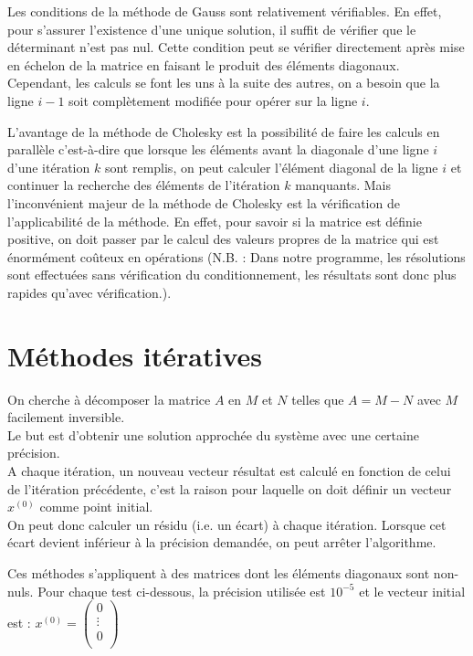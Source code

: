 \documentclass{report}
\begin{document}
    \vspace{0.7cm}
    Les conditions de la méthode de Gauss sont relativement vérifiables. En effet, pour s'assurer l'existence d'une unique solution, il suffit de vérifier que le déterminant n'est pas nul. Cette condition peut se vérifier directement après mise en échelon de la matrice en faisant le produit des éléments diagonaux.\\
    Cependant, les calculs se font les uns à la suite des autres, on a besoin que la ligne $i-1$ soit complètement modifiée pour opérer sur la ligne $i$.

    \vspace{0.7cm}
    L'avantage de la méthode de Cholesky est la possibilité de faire les calculs en parallèle c'est-à-dire que lorsque les éléments avant la diagonale d'une ligne $i$ d'une itération $k$ sont remplis, on peut calculer l'élément diagonal de la ligne $i$ et continuer la recherche des éléments de l'itération $k$ manquants.
    Mais l'inconvénient majeur de la méthode de Cholesky est la vérification de  l'applicabilité de la méthode. En effet, pour savoir si la matrice est définie positive, on doit passer par le calcul des valeurs propres de la matrice qui est énormément coûteux en opérations (N.B. : Dans notre programme, les résolutions sont effectuées sans vérification du conditionnement, les résultats sont donc plus rapides qu'avec vérification.).
    
     
  \chapter{Méthodes itératives}
      On cherche à décomposer la matrice $A$ en $M$ et $N$ telles que $A = M-N$ avec $M$ facilement inversible.\\
      
      \vspace{0.3cm}
      Le but est d'obtenir une solution approchée du système avec une certaine précision.\\
      A chaque itération, un nouveau vecteur résultat est calculé en fonction de celui de l'itération précédente, c'est la raison pour laquelle on doit définir un vecteur $x^{(0)}$ comme point initial.\\
      On peut donc calculer un résidu (i.e. un écart) à chaque itération. Lorsque cet écart devient inférieur à la précision demandée, on peut arrêter l'algorithme.
      
      \vspace{0.3cm}
      Ces méthodes s'appliquent à des matrices dont les éléments diagonaux sont non-nuls.
      Pour chaque test ci-dessous, la précision utilisée est $10^{-5}$ et le vecteur initial est :
      $x^{(0)} = \begin{pmatrix}
                    0 \\
                    \vdots \\
                    0 \\
                 \end{pmatrix}$
    \newpage
\end{document}

